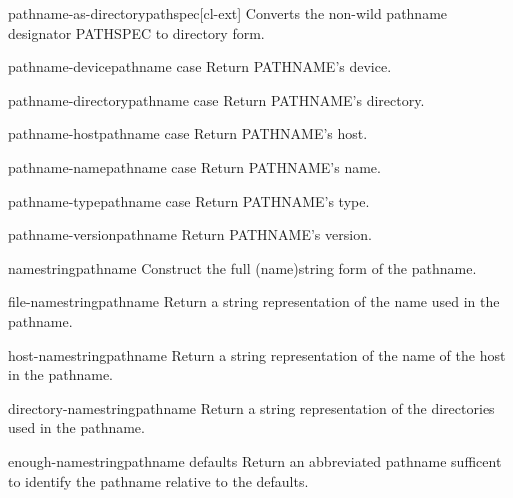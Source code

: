 \documentclass[10pt,english]{book}
\begin{document}
\begin{function}{pathname-as-directory}{pathspec}[cl-ext]
  Converts the non-wild pathname designator PATHSPEC to directory
form.
\end{function}

\begin{function}{pathname-device}{pathname \key case}
  Return PATHNAME's device.
\end{function}

\begin{function}{pathname-directory}{pathname \key case}
  Return PATHNAME's directory.
\end{function}

\begin{function}{pathname-host}{pathname \key case}
  Return PATHNAME's host.
\end{function}

\begin{function}{pathname-name}{pathname \key case}
  Return PATHNAME's name.
\end{function}

\begin{function}{pathname-type}{pathname \key case}
  Return PATHNAME's type.
\end{function}

\begin{function}{pathname-version}{pathname}
  Return PATHNAME's version.
\end{function}

\begin{function}{namestring}{pathname}
  Construct the full (name)string form of the pathname.
\end{function}

\begin{function}{file-namestring}{pathname}
  Return a string representation of the name used in the pathname.
\end{function}

\begin{function}{host-namestring}{pathname}
  Return a string representation of the name of the host in the pathname.
\end{function}

\begin{function}{directory-namestring}{pathname}
  Return a string representation of the directories used in the pathname.
\end{function}

\begin{function}{enough-namestring}{pathname \op defaults}
  Return an abbreviated pathname sufficent to identify the pathname relative
   to the defaults.
\end{function}
\end{document}
